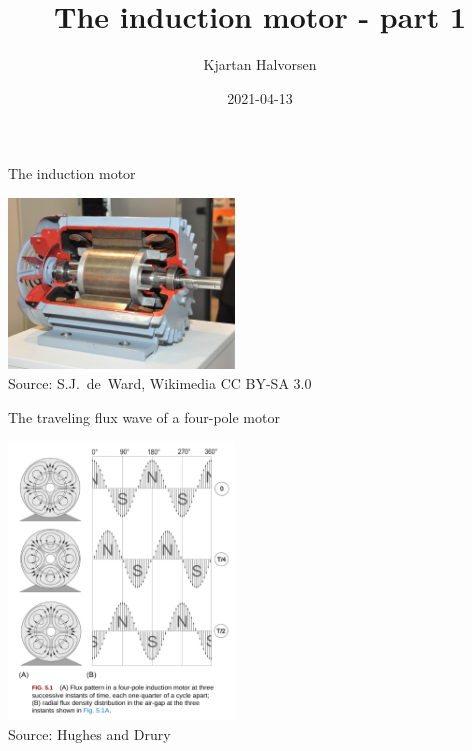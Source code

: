 \documentclass[dvisvgm,hypertex,aspectratio=169]{beamer}
\author{Kjartan Halvorsen}
\date{2021-04-13}
\title{The induction motor - part 1}
\begin{document}
\maketitle


\begin{frame}{The induction motor}

  \begin{center}
    \includegraphics[width=6cm]{wikimedia-induction-motor.jpeg}\\
    {\footnotesize Source: S.J.~de~Ward, Wikimedia CC BY-SA 3.0}
  \end{center}

\end{frame}


\begin{frame}{The traveling flux wave of a four-pole motor}

  \begin{center}
    \includegraphics[width=6cm]{HD-fig5_1.png}\\
    {\footnotesize Source: Hughes and Drury}
  \end{center}

\end{frame}



%
%
\end{document}
